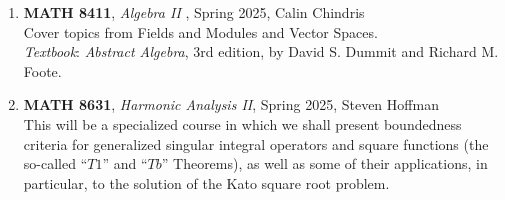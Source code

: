\documentclass{article}
\begin{document}
\begin{enumerate}[leftmargin=0in]
    \item[] \textbf{MATH 8411}, \textit{Algebra II} , Spring 2025, Calin Chindris\\
    Cover topics from Fields and Modules and Vector Spaces. \\
    \textit{Textbook}: \textit{Abstract Algebra}, 3rd edition, by David S. Dummit and Richard M. Foote.

    \item[] \textbf{MATH 8631}, \textit{Harmonic Analysis II}, Spring 2025, Steven Hoffman\\
    This will be a specialized course in which we shall present boundedness criteria for generalized singular integral operators and square functions (the so-called ``$T1$'' and ``$Tb$'' Theorems), as well as some of their applications, in particular, to the solution of the Kato square root problem. 
\end{enumerate}
\end{document}
